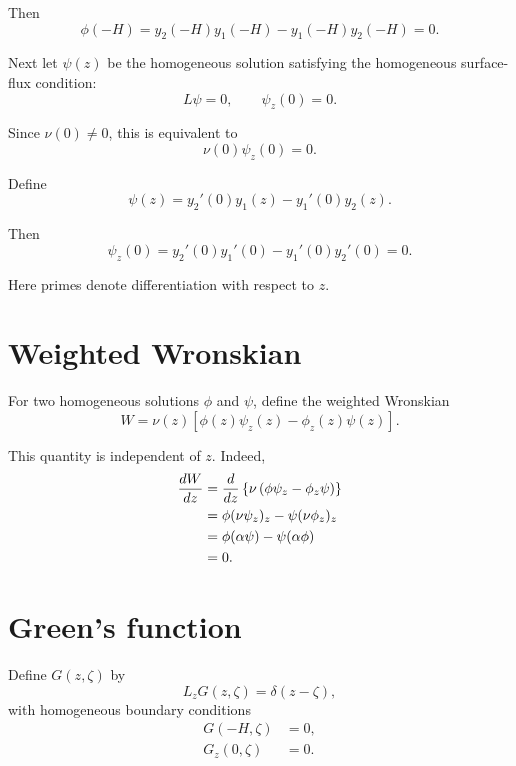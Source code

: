 \documentclass[10pt]{amsart}
\begin{document}
Then
\[
\phi(-H)
=
y_2(-H)y_1(-H)-y_1(-H)y_2(-H)
=
0.
\]

Next let \(\psi(z)\) be the homogeneous solution satisfying the homogeneous surface-flux condition:
\begin{equation}
L\psi=0,
\qquad
\psi_z(0)=0.
\label{eq:psi_def}
\end{equation}

Since \(\nu(0)\ne 0\), this is equivalent to
\[
\nu(0)\psi_z(0)=0.
\]

Define
\begin{equation}
\psi(z)
=
y_2'(0)y_1(z)-y_1'(0)y_2(z).
\label{eq:psi}
\end{equation}

Then
\[
\psi_z(0)
=
y_2'(0)y_1'(0)-y_1'(0)y_2'(0)
=
0.
\]

Here primes denote differentiation with respect to \(z\).

\section{Weighted Wronskian}

For two homogeneous solutions \(\phi\) and \(\psi\), define the weighted Wronskian
\begin{equation}
W
=
\nu(z)
\left[
\phi(z)\psi_z(z)-\phi_z(z)\psi(z)
\right].
\label{eq:wronskian}
\end{equation}

This quantity is independent of \(z\). Indeed,
\begin{align}
\frac{dW}{dz}
&=
\frac{d}{dz}
\left\{
\nu
\left(
\phi\psi_z-\phi_z\psi
\right)
\right\} \notag\\
&=
\phi(\nu\psi_z)_z-\psi(\nu\phi_z)_z \notag\\
&=
\phi(\alpha\psi)-\psi(\alpha\phi) \notag\\
&=0.
\end{align}

\section{Green's function}

Define \(G(z,\zeta)\) by
\begin{equation}
L_z G(z,\zeta)=\delta(z-\zeta),
\label{eq:green_def}
\end{equation}
with homogeneous boundary conditions
\begin{align}
G(-H,\zeta)&=0, \label{eq:G_bottom}\\
G_z(0,\zeta)&=0. \label{eq:G_surface}
\end{align}
\end{document}
